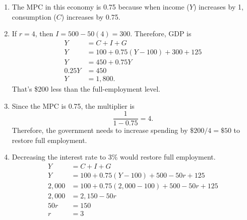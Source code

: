 \documentclass{article}
\begin{document}
\begin{enumerate}
\begin{enumerate}
	\item The MPC in this economy is 0.75 because when income ($Y$) increases by 1, consumption ($C$) increases by 0.75.
	
	\item If $r = 4$, then $I = 500 - 50(4) = 300$. Therefore, GDP is
		\begin{align*}
		Y &= C + I + G \\
		Y &= 100 + 0.75(Y - 100) + 300 + 125 \\
		Y &= 450 + 0.75Y \\
		0.25Y &= 450 \\
		Y &= 1,800.
		\end{align*}
		That's \$200 less than the full-employment level.
		
	\item Since the MPC is 0.75, the multiplier is 
		\[\frac{1}{1 - 0.75} = 4.\]
		Therefore, the government needs to increase spending by $\$200/4 = \$50$ to restore full employment.
		
	\item Decreasing the interest rate to 3\% would restore full employment.
		\begin{align*}
		Y &= C + I + G \\
		Y &= 100 + 0.75(Y - 100) + 500 - 50r + 125 \\
		2,000 &= 100 + 0.75(2,000 - 100) + 500 - 50r + 125 \\
		2,000 &= 2,150 - 50r \\
		50r &= 150 \\
		r &= 3
		\end{align*}
	
	\end{enumerate}
	
\end{enumerate}
\end{document}
